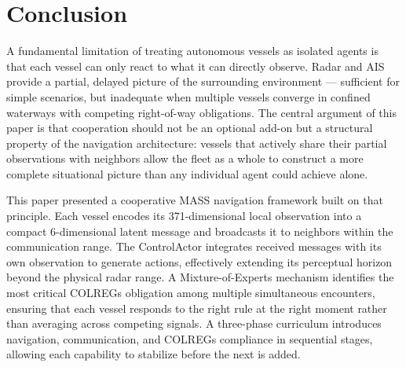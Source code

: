 \documentclass[final,5p,times,twocolumn]{elsarticle}
\begin{document}
\section{Conclusion}
{\color{red}
A fundamental limitation of treating autonomous vessels as isolated agents is that each vessel can only react to what it can directly observe. Radar and AIS provide a partial, delayed picture of the surrounding environment --- sufficient for simple scenarios, but inadequate when multiple vessels converge in confined waterways with competing right-of-way obligations. The central argument of this paper is that cooperation should not be an optional add-on but a structural property of the navigation architecture: vessels that actively share their partial observations with neighbors allow the fleet as a whole to construct a more complete situational picture than any individual agent could achieve alone.

This paper presented a cooperative MASS navigation framework built on that principle. Each vessel encodes its 371-dimensional local observation into a compact 6-dimensional latent message and broadcasts it to neighbors within the communication range. The ControlActor integrates received messages with its own observation to generate actions, effectively extending its perceptual horizon beyond the physical radar range. A Mixture-of-Experts mechanism identifies the most critical COLREGs obligation among multiple simultaneous encounters, ensuring that each vessel responds to the right rule at the right moment rather than averaging across competing signals. A three-phase curriculum introduces navigation, communication, and COLREGs compliance in sequential stages, allowing each capability to stabilize before the next is added.

}
\end{document}
